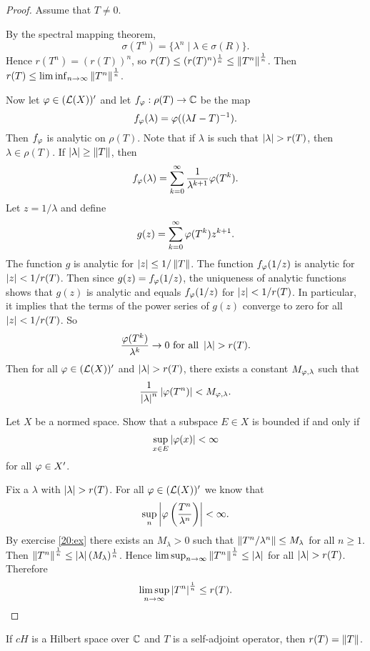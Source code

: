 \begin{proof}
  Assume that $T \neq 0$.

  By the spectral mapping theorem,
  \[ \sigma(T^n) = \{ \lambda^n \mid \lambda \in \sigma(R) \}. \]
  Hence $r(T^n) = (r(T))^n$, so $r(T) \leq (r(T)^n)^\frac 1n \leq \left\lVert T^n \right\rVert^\frac 1n$.
  Then $r(T) \leq \liminf_{n\to\infty} \left\lVert T^n \right\rVert^\frac 1n$.

  Now let $\varphi \in (\mathcal{L}(X))'$ and let $f_\varphi: \rho(T) \to \mathbb{C}$ be the map
  \[ f_\varphi(\lambda) = \varphi( (\lambda I-T)^{-1} ). \]
  Then $f_\varphi$ is analytic on $\rho(T)$.
  Note that if $\lambda$ is such that $\left\lvert \lambda \right\rvert>r(T)$, then $\lambda \in \rho(T)$.
  If $\left\lvert \lambda \right\rvert \geq \left\lVert T \right\rVert$, then
  \[ f_\varphi(\lambda) = \sum_{k=0}^\infty \frac{1}{\lambda^{k+1}}\varphi(T^k). \]
  Let $z=1/\lambda$ and define
  \[ g(z) = \sum_{k=0}^\infty \varphi(T^k) z^{k+1}. \]
  The function $g$ is analytic for $\left\lvert z \right\rvert \leq 1/\left\lVert T \right\rVert$.
  The function $f_\varphi(1/z)$ is analytic for $\left\lvert z \right\rvert < 1/r(T)$.
  Then since $g(z) = f_\varphi(1/z)$, the uniqueness of analytic functions shows that $g(z)$ is analytic and equals $f_\varphi(1/z)$ for $\left\lvert z \right\rvert<1/r(T)$.
  In particular, it implies that the terms of the power series of $g(z)$ converge to zero for all $\left\lvert z \right\rvert<1/r(T)$.
  So
  \[ \frac{\varphi(T^k)}{\lambda^k} \to 0 \text{ for all } \left\lvert \lambda \right\rvert>r(T). \]
  Then for all $\varphi \in (\mathcal{L}(X))'$ and $\left\lvert \lambda \right\rvert>r(T)$, there exists a constant $M_{\varphi,\lambda}$ such that
  \[ \frac{1}{\left\lvert \lambda \right\rvert^n}\left\lvert \varphi(T^n) \right\rvert < M_{\varphi,\lambda}. \]

  \begin{exer}\label{20:ex}
    Let $X$ be a normed space.
    Show that a subspace $E \in X$ is bounded if and only if
    \[ \sup_{x \in E} \left\lvert \varphi(x) \right\rvert < \infty \]
    for all $\varphi \in X'$.
  \end{exer}

  Fix a $\lambda$ with $\left\lvert \lambda \right\rvert>r(T)$.
  For all $\varphi \in (\mathcal{L}(X))'$ we know that
  \[ \sup_n \left\lvert \varphi\left( \frac{T^n}{\lambda^n} \right) \right\rvert<\infty. \]
  By exercise \ref{20:ex} there exists an $M_\lambda>0$ such that $\left\lVert T^n/\lambda^n \right\rVert\leq M_\lambda$ for all $n \geq 1$.
  Then $\left\lVert T^n \right\rVert^\frac 1n \leq \left\lvert \lambda \right\rvert(M_\lambda)^\frac 1n$.
  Hence $\limsup_{n\to\infty} \left\lVert T^n \right\rVert^\frac 1n \leq \left\lvert \lambda \right\rvert$ for all $\left\lvert \lambda \right\rvert>r(T)$.
  Therefore
  \[ \limsup_{n\to\infty}\left\lvert T^n \right\rvert^\frac 1n \leq r(T). \qedhere \]
\end{proof}

\begin{exer}
  If $cH$ is a Hilbert space over $\mathbb{C}$ and $T$ is a self-adjoint operator, then $r(T)=\left\lVert T \right\rVert$.
\end{exer}


